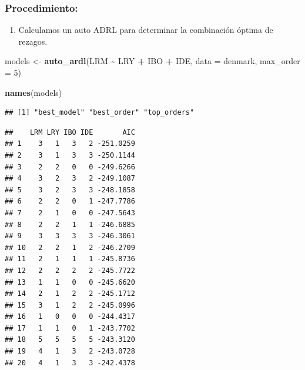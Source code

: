 \documentclass[
]{book}
\newenvironment{Shaded}{\begin{snugshade}}{\end{snugshade}}
\newcommand{\AttributeTok}[1]{\textcolor[rgb]{0.13,0.29,0.53}{#1}}
\newcommand{\CommentTok}[1]{\textcolor[rgb]{0.56,0.35,0.01}{\textit{#1}}}
\newcommand{\DecValTok}[1]{\textcolor[rgb]{0.00,0.00,0.81}{#1}}
\newcommand{\FunctionTok}[1]{\textcolor[rgb]{0.13,0.29,0.53}{\textbf{#1}}}
\newcommand{\NormalTok}[1]{#1}
\newcommand{\OtherTok}[1]{\textcolor[rgb]{0.56,0.35,0.01}{#1}}
\newcommand{\SpecialCharTok}[1]{\textcolor[rgb]{0.81,0.36,0.00}{\textbf{#1}}}
\providecommand{\tightlist}{%
  \setlength{\itemsep}{0pt}\setlength{\parskip}{0pt}}
\begin{document}
\hypertarget{procedimiento}{%
\subsubsection{Procedimiento:}\label{procedimiento}}

\begin{enumerate}
\def\labelenumi{\arabic{enumi}.}
\tightlist
\item
  Calculamos un auto ADRL para determinar la combinación óptima de rezagos.
\end{enumerate}

\begin{Shaded}
\begin{Highlighting}[]
\NormalTok{models }\OtherTok{\textless{}{-}} \FunctionTok{auto\_ardl}\NormalTok{(LRM }\SpecialCharTok{\textasciitilde{}}\NormalTok{ LRY }\SpecialCharTok{+}\NormalTok{ IBO }\SpecialCharTok{+}\NormalTok{ IDE, }\AttributeTok{data =}\NormalTok{ denmark, }\AttributeTok{max\_order =} \DecValTok{5}\NormalTok{)}

\FunctionTok{names}\NormalTok{(models)}
\end{Highlighting}
\end{Shaded}

\begin{verbatim}
## [1] "best_model" "best_order" "top_orders"
\end{verbatim}

\begin{Shaded}
\end{Shaded}

\begin{verbatim}
##    LRM LRY IBO IDE       AIC
## 1    3   1   3   2 -251.0259
## 2    3   1   3   3 -250.1144
## 3    2   2   0   0 -249.6266
## 4    3   2   3   2 -249.1087
## 5    3   2   3   3 -248.1858
## 6    2   2   0   1 -247.7786
## 7    2   1   0   0 -247.5643
## 8    2   2   1   1 -246.6885
## 9    3   3   3   3 -246.3061
## 10   2   2   1   2 -246.2709
## 11   2   1   1   1 -245.8736
## 12   2   2   2   2 -245.7722
## 13   1   1   0   0 -245.6620
## 14   2   1   2   2 -245.1712
## 15   3   1   2   2 -245.0996
## 16   1   0   0   0 -244.4317
## 17   1   1   0   1 -243.7702
## 18   5   5   5   5 -243.3120
## 19   4   1   3   2 -243.0728
## 20   4   1   3   3 -242.4378
\end{verbatim}
\end{document}
